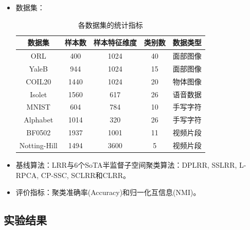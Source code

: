 \documentclass{beamer}
\begin{document}
\begin{frame}
\begin{itemize}
\item 数据集：

\begin{table}[H]
    \scriptsize
	\renewcommand{\arraystretch}{1.1}
	\caption{各数据集的统计指标}
        \vspace{-0.4cm}
	\label{table_1}
	\centering
	\begin{tabular}{ccccc}
		\hline
		数据集 & 样本数 & 样本特征维度 & 类别数 & 数据类型\\
		\hline
        ORL & 400 & 1024 & 40 & 面部图像\\
        YaleB & 944 & 1024 & 15 & 面部图像\\
        COIL20 & 1440 & 1024 & 20 & 物体图像\\
        Isolet & 1560 & 617 & 26 & 语音数据\\
        MNIST & 604 & 784 & 10 & 手写字符\\
        Alphabet & 1014 & 320 & 26 & 手写字符\\
            BF0502 & 1937 & 1001 & 11 & 视频片段\\
          Notting-Hill & 1494 & 3600 & 5 & 视频片段\\
		\hline
	\end{tabular}
\end{table}

\item 基线算法：LRR与6个SoTA半监督子空间聚类算法：DPLRR, SSLRR, L-RPCA, CP-SSC, SCLRR和CLRR。

\item 评价指标：聚类准确率(Accuracy)和归一化互信息(NMI)。

\end{itemize}
\end{frame}

\subsection{实验结果}
\end{document}
